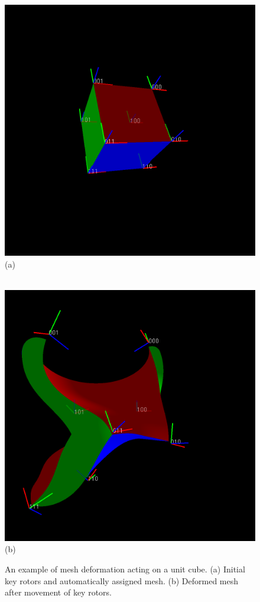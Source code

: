 \begin{figure}[p]
\centering
\includegraphics[height=0.37\textheight]{cube_before} \\
\noindent (a) \\ \rule{0pt}{\parskip} \\
\includegraphics[height=0.37\textheight]{cube_after} \\
\noindent (b) 
\caption{\label{fig:cubeexample}An example of mesh deformation acting on a unit cube.
  (a) Initial key rotors and automatically assigned mesh. 
  (b) Deformed mesh after movement of key rotors.} 
\end{figure}

